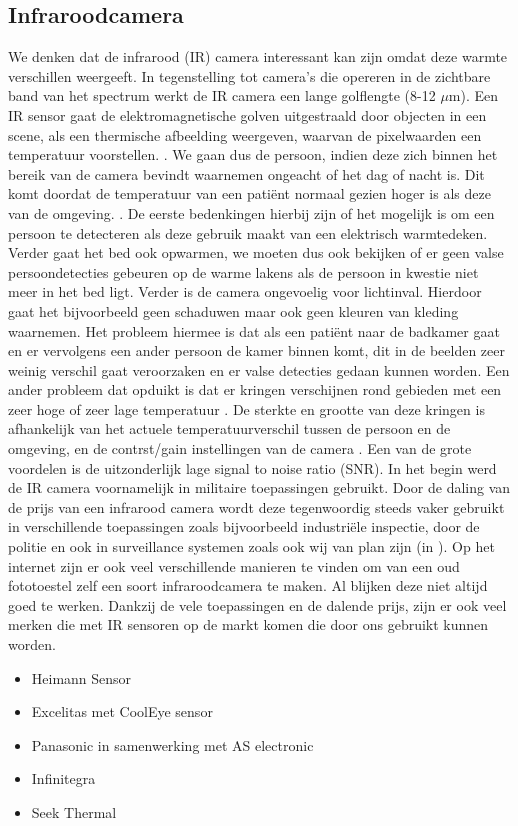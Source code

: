 \subsection{Infraroodcamera}
\label{refIRC}
We denken dat de infrarood (IR) camera interessant kan zijn omdat deze warmte verschillen weergeeft. In tegenstelling tot camera's die opereren in de zichtbare band van het spectrum werkt de IR camera  een lange golflengte (8-12 $\mu$m). Een IR sensor gaat de elektromagnetische golven uitgestraald door objecten in een scene, als een thermische afbeelding weergeven, waarvan de pixelwaarden een temperatuur voorstellen. \cite{bibIRC2}. We gaan dus de persoon, indien deze zich binnen het bereik van de camera bevindt waarnemen ongeacht of het dag of nacht is. Dit komt doordat de temperatuur van een pati\"ent normaal gezien hoger is als deze van de omgeving. \cite{bibIRC3}.
De eerste bedenkingen hierbij zijn of het mogelijk is om een persoon te detecteren als deze gebruik maakt van een elektrisch warmtedeken. Verder gaat het bed ook opwarmen, we moeten dus ook bekijken of er geen valse persoondetecties gebeuren op de warme lakens als de persoon in kwestie niet meer in het bed ligt. Verder is de camera ongevoelig voor lichtinval. Hierdoor gaat het bijvoorbeeld geen schaduwen maar ook geen kleuren van kleding waarnemen. Het probleem hiermee is dat als een pati\"ent naar de badkamer gaat en er vervolgens een ander persoon de kamer binnen komt, dit in de beelden zeer weinig verschil gaat veroorzaken en er valse detecties gedaan kunnen worden.  Een ander probleem dat opduikt is dat er kringen verschijnen rond gebieden met een zeer hoge of zeer lage temperatuur \cite{bibIRC4}. De sterkte en grootte van deze kringen is afhankelijk van het actuele temperatuurverschil tussen de persoon en de omgeving, en de contrst/gain instellingen van de camera \cite{bibBET6}. Een van de grote voordelen is de uitzonderlijk lage signal to noise ratio (SNR). In het begin werd de IR camera voornamelijk in militaire toepassingen gebruikt. Door de daling van de prijs van een infrarood camera wordt deze tegenwoordig steeds vaker gebruikt in verschillende toepassingen zoals bijvoorbeeld industri\"ele inspectie, door de politie en ook in surveillance systemen zoals ook wij van plan zijn (in \cite{bibBET6}). Op het internet zijn er ook veel verschillende manieren te vinden om van een oud fototoestel zelf een soort infraroodcamera te maken. Al blijken deze niet altijd goed te werken.
Dankzij de vele toepassingen en de dalende prijs, zijn er ook veel merken die met IR sensoren op de markt komen die door ons gebruikt kunnen worden.
\begin{itemize}
	\item Heimann Sensor
	\item Excelitas met CoolEye sensor
	\item Panasonic in samenwerking met AS electronic
	\item Infinitegra
	\item Seek Thermal
\end{itemize}


